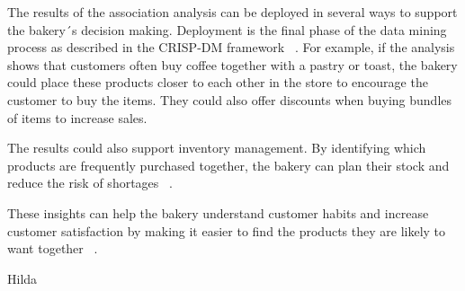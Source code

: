 \label{chap:deployment}
The results of the association analysis can be deployed in several ways to support the bakery´s decision making.
Deployment is the final phase of the data mining process as described in the CRISP-DM framework ~\cite{crispdm}.
For example, if the analysis shows that customers often buy coffee together with a pastry or toast, 
the bakery could place these products closer to each other in the store to encourage the customer to buy the items. 
They could also offer discounts when buying bundles of items to increase sales. 

The results could also support inventory management. By identifying which products are frequently purchased together, 
the bakery can plan their stock and reduce the risk of shortages ~\cite[Ch.~9]{courseLitt}.  

These insights can help the bakery understand customer habits and increase customer satisfaction by making 
it easier to find the products they are likely to want together ~\cite[Ch.~6]{BigData}. 


Hilda